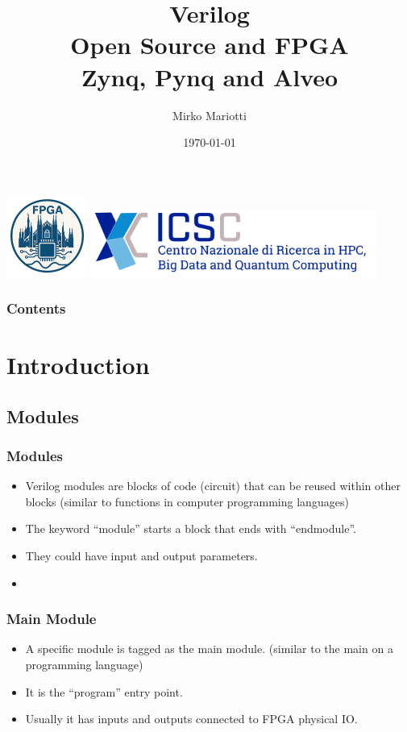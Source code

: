 \documentclass{beamer}
\begin{document}
\title[\today]{Verilog\\Open Source and FPGA\\Zynq, Pynq and Alveo}
\author{Mirko Mariotti}
\date{\today}

\begin{frame}
{
    \includegraphics[width=0.2\textwidth]{mi.png}  
    \hfill
    \includegraphics[width=0.7\textwidth]{iscs.png}
}
\titlepage
\end{frame}

\begin{frame}\frametitle{Contents}
\fontsize{6}{7.2}\selectfont
\tableofcontents
\end{frame} 

\section{Introduction}

\subsection{Modules}

\begin{frame}\frametitle{Modules}
\begin{itemize}
	\item<1-> Verilog modules are blocks of code (circuit) that can be reused within other blocks (similar to functions in computer programming languages)
	\item<2-> The keyword ``module'' starts a block that ends with ``endmodule''.
	\item<3-> They could have input and output parameters.
	\item<3-> 
\end{itemize}
\end{frame}

\begin{frame}\frametitle{Main Module}
\begin{itemize}
	\item<1-> A specific module is tagged as the main module. (similar to the main on a programming language)
	\vspace{0.5cm}
	\item<2-> It is the ``program'' entry point.
	\vspace{0.5cm}
	\item<3-> Usually it has inputs and outputs connected to FPGA physical IO.
\end{itemize}
\end{frame}
\end{document}

